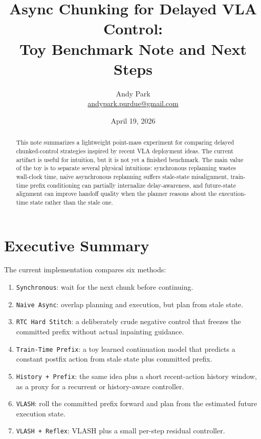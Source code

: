 \documentclass[11pt]{article}
\title{Async Chunking for Delayed VLA Control:\\Toy Benchmark Note and Next Steps}
\author{Andy Park\\\href{mailto:andypark.purdue@gmail.com}{andypark.purdue@gmail.com}}
\date{April 19, 2026}
\begin{document}
\maketitle

\begin{abstract}
This note summarizes a lightweight point-mass experiment for comparing delayed chunked-control strategies inspired by recent VLA deployment ideas. The current artifact is useful for intuition, but it is not yet a finished benchmark. The main value of the toy is to separate several physical intuitions: synchronous replanning wastes wall-clock time, naive asynchronous replanning suffers stale-state misalignment, train-time prefix conditioning can partially internalize delay-awareness, and future-state alignment can improve handoff quality when the planner reasons about the execution-time state rather than the stale one.
\end{abstract}

\section{Executive Summary}

The current implementation compares six methods:
\begin{enumerate}[leftmargin=1.5em]
  \item \texttt{Synchronous}: wait for the next chunk before continuing.
  \item \texttt{Naive Async}: overlap planning and execution, but plan from stale state.
  \item \texttt{RTC Hard Stitch}: a deliberately crude negative control that freezes the committed prefix without actual inpainting guidance.
  \item \texttt{Train-Time Prefix}: a toy learned continuation model that predicts a constant postfix action from stale state plus committed prefix.
  \item \texttt{History + Prefix}: the same idea plus a short recent-action history window, as a proxy for a recurrent or history-aware controller.
  \item \texttt{VLASH}: roll the committed prefix forward and plan from the estimated future execution state.
  \item \texttt{VLASH + Reflex}: VLASH plus a small per-step residual controller.
\end{enumerate}
\end{document}
